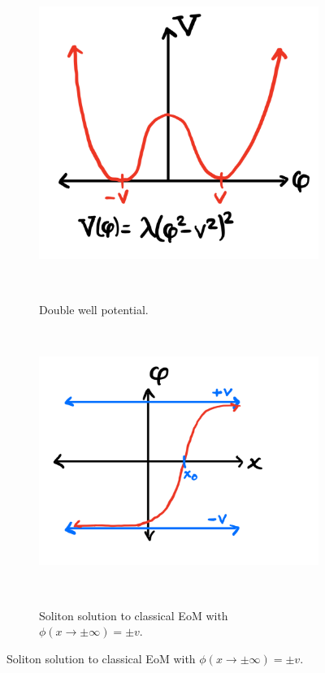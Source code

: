 \documentclass[11pt, oneside]{article}   	%
\theoremstyle{definition}
\begin{document}
\begin{figure}[H]
	\centering
	\begin{subfigure}[t]{.38\textwidth}
		\centering
		\includegraphics[width = .8\textwidth]{double_well}
		\caption{Double well potential.}~
		\label{subfig:double_well}
	\end{subfigure}
	~
	\begin{subfigure}[t]{.38\textwidth}
		\centering
		\includegraphics[width = .8\textwidth]{soliton_1d}
		\caption{Soliton solution to classical EoM with $\phi(x\rightarrow\pm\infty) = \pm v$.}~
		\label{subfig:double_well_soliton}
	\end{subfigure}
\end{figure}
\end{document}
